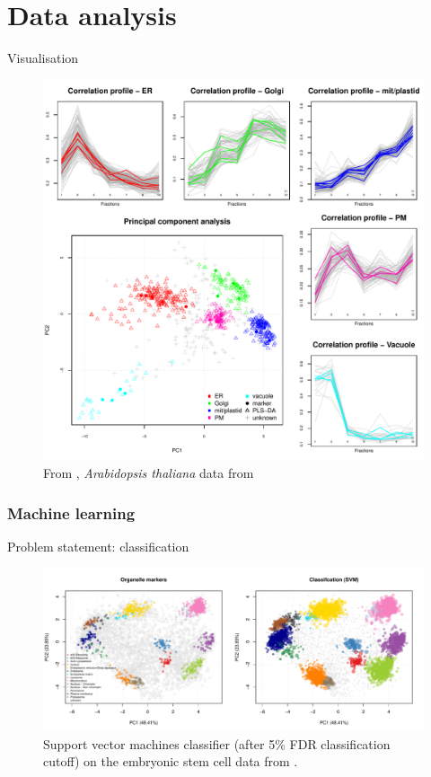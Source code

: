 \documentclass{beamer}
\theoremstyle{example}
\begin{document}

\section{Data analysis}


\begin{frame}{Visualisation}
  \begin{figure}
    \centering
    \includegraphics[width=.6\linewidth]{figs/F04-analyses.pdf}
    \caption{From \cite{Gatto:2010}, \textit{Arabidopsis thaliana} data
      from \cite{Dunkley:2006}}
  \end{figure}
\end{frame}

\subsubsection*{Machine learning}
\label{sec:ml}

\begin{frame}{Problem statement: classification}
  \begin{figure}[h]
    \centering
    \includegraphics[width=\linewidth]{figs/hyperlopit-class.pdf}
    \caption{Support vector machines classifier (after 5\% FDR
      classification cutoff) on the embryonic stem cell data from
      \cite{Christoforou:2016}.}
  \end{figure}
\end{frame}
\end{document}
